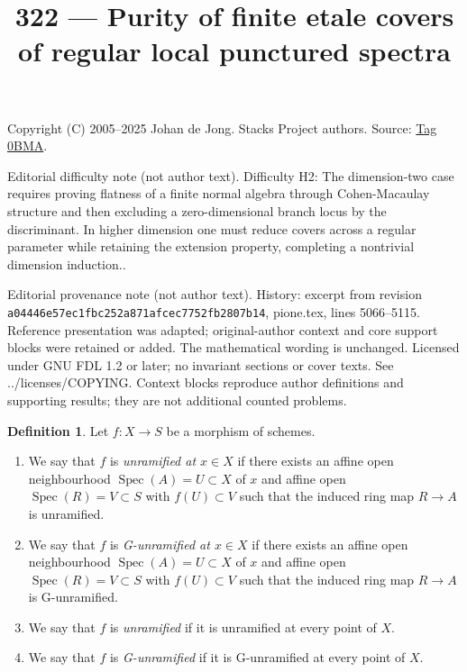 \documentclass{amsart}
\theoremstyle{plain}
\theoremstyle{definition}
\newtheorem{definition}[subsection]{Definition}
\theoremstyle{remark}
\numberwithin{equation}{subsection}
\def\Spec{\mathop{\mathrm{Spec}}}
\begin{document}
\title[Stacks Project, Tag 0BMA]{322 --- Purity of finite etale covers of regular local punctured spectra}
\maketitle
\noindent Copyright (C) 2005--2025 Johan de Jong. Stacks Project authors. Source: \href{https://stacks.math.columbia.edu/tag/0BMA}{Tag 0BMA}.

\noindent Editorial difficulty note (not author text). Difficulty H2: The dimension-two case requires proving flatness of a finite normal algebra through Cohen-Macaulay structure and then excluding a zero-dimensional branch locus by the discriminant. In higher dimension one must reduce covers across a regular parameter while retaining the extension property, completing a nontrivial dimension induction..

\noindent Editorial provenance note (not author text). History: excerpt from revision \texttt{a0444\allowbreak 6e57e\allowbreak c1fbc\allowbreak 252a8\allowbreak 71afc\allowbreak ec775\allowbreak 2fb28\allowbreak 07b14}, pione.tex, lines 5066--5115. Reference presentation was adapted; original-author context and core support blocks were retained or added. The mathematical wording is unchanged. Licensed under GNU FDL 1.2 or later; no invariant sections or cover texts. See ../licenses/COPYING. Context blocks reproduce author definitions and supporting results; they are not additional counted problems.

\begin{definition}
\label{morphisms-definition-unramified}
Let $f : X \to S$ be a morphism of schemes.
\begin{enumerate}
\item We say that $f$ is {\it unramified at $x \in X$} if
there exists an affine open neighbourhood $\Spec(A) = U \subset X$
of $x$ and affine open $\Spec(R) = V \subset S$
with $f(U) \subset V$ such that the induced ring map
$R \to A$ is unramified.
\item We say that $f$ is {\it G-unramified at $x \in X$} if
there exists an affine open neighbourhood $\Spec(A) = U \subset X$
of $x$ and affine open $\Spec(R) = V \subset S$
with $f(U) \subset V$ such that the induced ring map
$R \to A$ is G-unramified.
\item We say that $f$ is {\it unramified} if it is unramified
at every point of $X$.
\item We say that $f$ is {\it G-unramified} if it is G-unramified
at every point of $X$.
\end{enumerate}
\end{definition}
\end{document}
